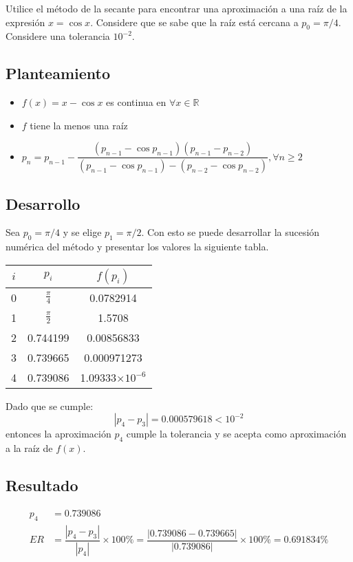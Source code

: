 \begin{exerciseT}
Utilice el método de la secante para encontrar una aproximación a una raíz de la expresión $x= \cos x$. Considere que se sabe 
que la raíz está cercana a $p_0=\pi/4$. Considere una tolerancia $10^{-2}$.
\subsection*{Planteamiento}
\begin{itemize}
	\item $f(x) = x-\cos x$ es continua en $\forall x\in\mathbb{R}$
	\item $f$ tiene la menos una raíz
	\item $p_n = p_{n-1} - \dfrac{(p_{n-1}-\cos p_{n-1})(p_{n-1}-p_{n-2})}{(p_{n-1}-\cos p_{n-1})-(p_{n-2}-\cos p_{n-2})}, \forall n\geq 2$
\end{itemize}

\subsection*{Desarrollo}
Sea $p_0 = \pi/4$ y se elige $p_1 = \pi/2$. Con esto se puede desarrollar la sucesión numérica del método y presentar los 
valores la siguiente tabla.
\begin{table}[H]
	\centering
	\begin{tabular}{c|c|c}
	$i$ & $p_i$ & $f(p_i)$ \\\midrule
	0 & $\frac{\pi}{4}$ & 0.0782914\\
	1 & $\frac{\pi}{2}$ & 1.5708\\
	2 & 0.744199 & 0.00856833\\
	3 & 0.739665 & 0.000971273\\
	4 & 0.739086 & 1.09333$\times 10^{-6}$ 
	\end{tabular}
\end{table}
Dado que se cumple: 
\[\left|p_4 -p_3 \right| = 0.000579618 < 10^{-2}  \]
entonces la aproximación $p_4$ cumple la tolerancia y se acepta como aproximación a la raíz de $f(x)$.

\subsection*{Resultado}
\begin{align*}
	p_4 &= 0.739086 \\
	ER &= \dfrac{\left|p_4 -p_3 \right|}{\left|p_4\right|}\times 100\% = \dfrac{\left|0.739086-0.739665\right|}{\left|0.739086\right|}\times 100\%
		= 0.691834\%
\end{align*}
\end{exerciseT}

